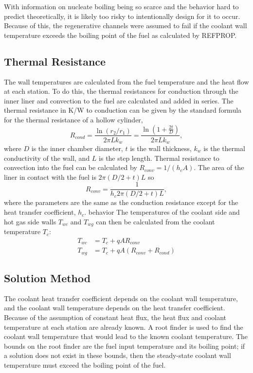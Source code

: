 \documentclass[11pt]{article}
\begin{document}
With information on nucleate boiling being so scarce and the behavior hard to predict theoretically, it is likely too risky to intentionally design for it to occur. Because of this, the regenerative channels were assumed to fail if the coolant wall temperature exceeds the boiling point of the fuel as calculated by REFPROP.

\subsection{Thermal Resistance}
The wall temperatures are calculated from the fuel temperature and the heat flow at each station. To do this, the thermal resistances for conduction through the inner liner and convection to the fuel are calculated and added in series. The thermal resistance in K/W to conduction can be given by the standard formula for the thermal resistance of a hollow cylinder,
\begin{equation}
    R_{cond} = \frac{\ln{\left(r_2 / r_1\right)}}{2 \pi L k_w} = \frac{\ln{\left( 1 + \frac{2t}{D}\right)}}{2 \pi L k_w},
\end{equation}
where $D$ is the inner chamber diameter, $t$ is the wall thickness, $k_w$ is the thermal conductivity of the wall, and $L$ is the step length. Thermal resistance to convection into the fuel can be calculated by $R_{conv} = 1 / (h_c A)$. The area of the liner in contact with the fuel is $2 \pi (D / 2 + t) L $ so
\begin{equation}
    R_{conv} = \frac{1}{h_c 2 \pi (D/2 + t) L},
\end{equation}
where the parameters are the same as the conduction resistance except for the heat transfer coefficient, $h_c$.
behavior
The temperatures of the coolant side and hot gas side walls $T_{wc}$ and $T_{wg}$ can then be calculated from the coolant temperature $T_c$:
\begin{align}
  T_{wc} & = T_c + q A R_{conv} \\
  T_{wg} & = T_c + q A (R_{conv} + R_{cond})
\end{align}

\subsection{Solution Method}
The coolant heat transfer coefficient depends on the coolant wall temperature, and the coolant wall temperature depends on the heat transfer coefficient. Because of the assumption of constant heat flux, the heat flux and coolant temperature at each station are already known. A root finder is used to find the coolant wall temperature that would lead to the known coolant temperature. The bounds on the root finder are the fuel input temperature and its boiling point; if a solution does not exist in these bounds, then the steady-state coolant wall temperature must exceed the boiling point of the fuel.
\end{document}
